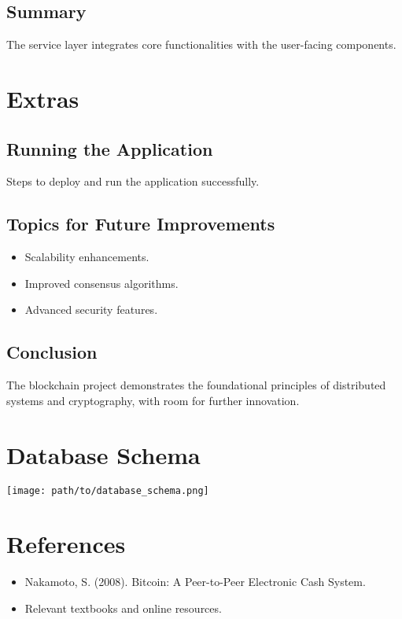 \documentclass[12pt,a4paper]{report}
\begin{document}
\section{Summary}
The service layer integrates core functionalities with the user-facing components.

\chapter{Extras}
\section{Running the Application}
Steps to deploy and run the application successfully.
\section{Topics for Future Improvements}
\begin{itemize}
    \item Scalability enhancements.
    \item Improved consensus algorithms.
    \item Advanced security features.
\end{itemize}
\section{Conclusion}
The blockchain project demonstrates the foundational principles of distributed systems and cryptography, with room for further innovation.

\appendix

\chapter{Database Schema}
\texttt{[image: path/to/database\_schema.png]}

\chapter{References}
\begin{itemize}
    \item Nakamoto, S. (2008). Bitcoin: A Peer-to-Peer Electronic Cash System.
    \item Relevant textbooks and online resources.
\end{itemize}
\end{document}
